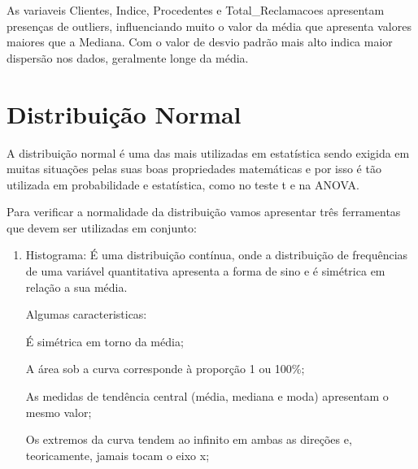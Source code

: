 \documentclass[
]{article}
\begin{document}
As variaveis Clientes, Indice, Procedentes e Total\_Reclamacoes
apresentam presenças de outliers, influenciando muito o valor da média
que apresenta valores maiores que a Mediana. Com o valor de desvio
padrão mais alto indica maior dispersão nos dados, geralmente longe da
média.

\hypertarget{distribuiuxe7uxe3o-normal}{%
\section{Distribuição Normal}\label{distribuiuxe7uxe3o-normal}}

A distribuição normal é uma das mais utilizadas em estatística sendo
exigida em muitas situações pelas suas boas propriedades matemáticas e
por isso é tão utilizada em probabilidade e estatística, como no teste t
e na ANOVA.

Para verificar a normalidade da distribuição vamos apresentar três
ferramentas que devem ser utilizadas em conjunto:

\begin{enumerate}
\def\labelenumi{\arabic{enumi}.}
\item
  Histograma: É uma distribuição contínua, onde a distribuição de
  frequências de uma variável quantitativa apresenta a forma de sino e é
  simétrica em relação a sua média.

  Algumas caracteristicas:

  É simétrica em torno da média;

  A área sob a curva corresponde à proporção 1 ou 100\%;

  As medidas de tendência central (média, mediana e moda) apresentam o
  mesmo valor;

  Os extremos da curva tendem ao infinito em ambas as direções e,
  teoricamente, jamais tocam o eixo x;
\end{enumerate}
\end{document}
